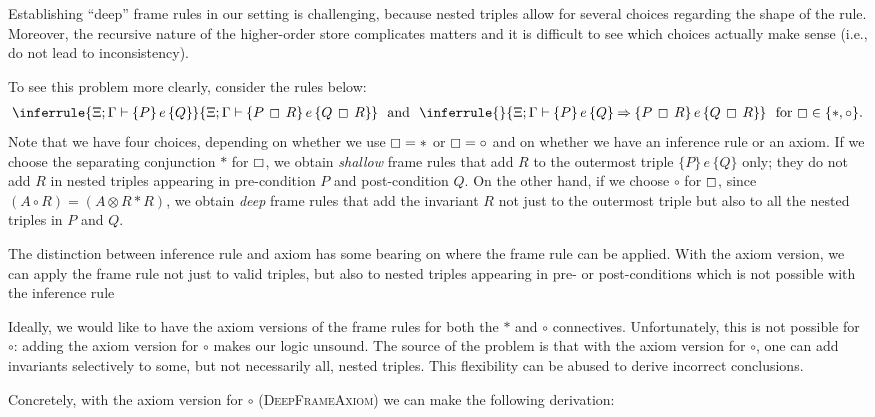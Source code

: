 \documentclass{LMCS}
\theoremstyle{remark}
\newcommand{\triple}[3]{{\ensuremath{\!\left.\{ #1 \}\, #2\, \{  #3 \}\!\right.}}}
\renewcommand{\clubsuit}{\boxempty}
\newcommand{\X}{\ensuremath{\Xi}}
\begin{document}
Establishing  ``deep'' frame rules in our setting is challenging, because nested triples allow for several choices regarding the shape of the rule.  Moreover, the recursive nature of the higher-order store complicates matters and it is difficult to see which choices actually make sense (i.e., do not lead to inconsistency).

To see this problem more clearly, consider
the rules below:
\begin{align*}
\inferrule{
  \X;\Gamma \vdash \triple{P}{e}{Q}
}{
  \X;\Gamma \vdash \triple{P \,\clubsuit\, R}{e}{Q \,\clubsuit\, R}
}
\ \ 
\mbox{and}
\ \ 
\inferrule{
}{
  \X;\Gamma \vdash \triple{P}{e}{Q} \Rightarrow \triple{P \,\clubsuit\, R}{e}{Q \,\clubsuit\, R}
}
\  \mbox{ for $\clubsuit \in \{*,\circ\}$}. 
\end{align*}
Note that we have four choices, depending on whether
we use $\clubsuit=*$ or $\clubsuit=\circ$ and on whether
we have an inference rule or an axiom. If we choose the separating conjunction $*$ for $\clubsuit$,
we obtain \emph{shallow} frame rules that  add $R$ to 
the outermost triple $\triple{P}{e}{Q}$ only; 
they do not add $R$ in nested triples
appearing in pre-condition $P$ and post-condition $Q$. On the other hand,
if we choose $\circ$ for $\clubsuit$, since $(A \circ R) = (A \otimes R * R)$,
we obtain \emph{deep} frame rules that add
the invariant $R$ not just 
to the outermost triple but also to all the nested triples in $P$ and $Q$. 

The distinction between inference rule and axiom has  
some bearing on where the frame rule can be applied. With
the axiom version, we can apply the frame rule not just to valid triples,
but also to nested triples appearing in pre- or post-conditions
which is not possible with the inference rule

Ideally, we would like to have the axiom versions of the frame rules
for both the $*$ and $\circ$ connectives. Unfortunately, this is not possible for $\circ$: 
adding the axiom version for $\circ$  makes our logic unsound.
The source of the problem is that with the axiom 
version for $\circ$, one can add invariants selectively to some, but not necessarily all,
nested triples. This flexibility can be abused to derive 
incorrect conclusions. 

Concretely, with the axiom version for $\circ$ (\textsc{DeepFrameAxiom}) we can make the following derivation:
\end{document}
